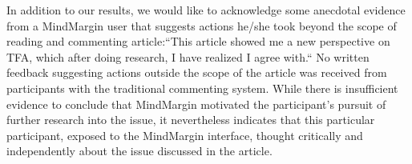 In addition to our results, we would like to acknowledge some anecdotal evidence from a MindMargin user that suggests actions he/she took beyond the scope of reading and commenting article:``This article showed me a new perspective on TFA, which after doing research, I have realized I agree with.`` No written feedback suggesting actions outside the scope of the article was received from participants with the traditional commenting system. While there is insufficient evidence to conclude that MindMargin motivated the participant's pursuit of further research into the issue, it nevertheless indicates that this particular participant, exposed to the MindMargin interface, thought critically and independently about the issue discussed in the article.